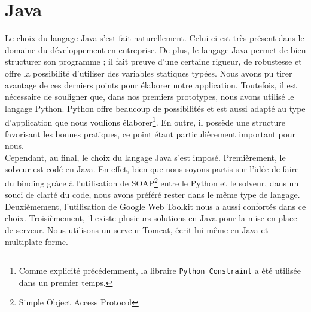 \section{Java}
Le choix du langage Java s'est fait naturellement. Celui-ci est très présent
dans le domaine du développement en entreprise. De plus, le langage Java permet de bien
structurer son programme ; il fait preuve d'une certaine rigueur, de robustesse
et offre la possibilité d'utiliser des variables statiques typées. Nous avons pu
tirer avantage de ces derniers points pour élaborer notre application.
\newline
\indent
Toutefois, il est nécessaire de souligner que, dans nos premiers prototypes, nous avons utilisé le langage Python. Python offre beaucoup de possibilités et est aussi adapté
au type d'application que nous voulions élaborer\footnote{Comme explicité précédemment, la libraire \texttt{Python Constraint} a été utilisée dans un premier temps.}. En outre, il possède une structure
favorisant les bonnes pratiques, ce point étant particulièrement important pour
nous.\\
\newline
\indent
Cependant, au final, le choix du langage Java s'est imposé. Premièrement, le solveur est codé en Java. En effet, bien que nous soyons partis sur l'idée de faire du binding grâce à l'utilisation de SOAP\footnote{Simple Object Access Protocol} entre le Python et le solveur, dans un souci de clarté du code, nous avons préféré rester dans le même type de langage.
Deuxièmement, l'utilisation de Google Web Toolkit nous a aussi confortés dans ce choix.
Troisièmement, il existe plusieurs solutions en Java pour la mise en place de serveur. Nous utilisons un serveur Tomcat, écrit lui-même en Java et multiplate-forme. 






